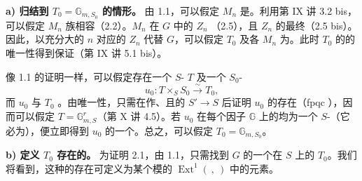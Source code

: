 \textbf{a) 归结到 $T_0=\mathbb G_{m,S_0}$ 的情形。}
由 1.1，可以假定 $M_n$ 是。利用第 IX 讲 3.2 bis，可以假定 $M_n$ 族相容（2.2）。$M_n$ 在 $G$ 中的 $Z_n$ （2.5），且 $Z_n$ 的最终（2.5 bis）。因此，以充分大的 $n$ 对应的 $Z_n$ 代替 $G$，可以假定 $T_0$ 及各 $M_n$ 为。此时 $T_0$ 的的唯一性得到保证（第 IX 讲 5.1 bis）。

像 1.1 的证明一样，可以假定存在一个 $S$- $T$ 及一个 $S_0$-
\[u_0:T\times_S S_0\xrightarrow{\sim}T_0,\]
而 $u_0$ 与 $T_0$ 。由唯一性，只需在作、且的 $S'\to S$ 后证明 $u_0$ 的存在（fpqc ），因而可以假定 $T=\mathbb G_{m,S}^r$（第 X 讲 4.5）。若 $u_0$ 在每个因子 $\mathbb G$ 上的均为一个 $S$-（它必为），便立即得到 $u_0$ 的一个。总之，可以假定 $T_0=\mathbb G_{m,S_0}$。

\textbf{b) 定义 $T_0$ 存在的。}
为证明 2.1，由 1.1，只需找到 $G$ 的一个在 $S$ 上的 $T_0$。我们将看到，这种的存在可定义为某个模的 $\operatorname{Ext}^1(\ ,\ )$ 中的元素。


